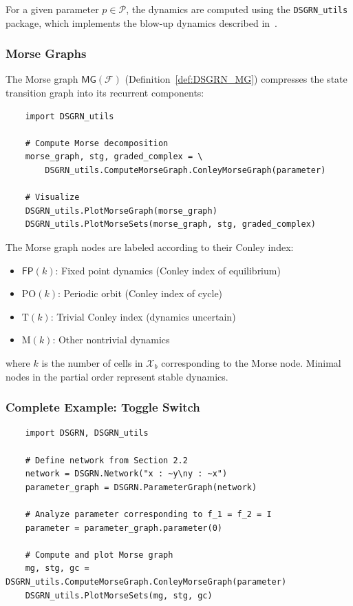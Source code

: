 \documentclass[12pt, notitlepage]{amsart}
\newcommand{\cF}{{\mathcal F}}
\newcommand{\cP}{{\mathcal P}}
\newcommand{\cX}{{\mathcal X}}
\theoremstyle{definition}
\newcommand{\MG}{\mathsf{MG}}
\newcommand{\FP}{\mathsf{FP}}
\begin{document}
    For a given parameter $p \in \cP$, the dynamics are computed using the \texttt{DSGRN\_utils} package, which implements the blow-up dynamics described in~\cite{rook_field:24}.

    \subsubsection{Morse Graphs}

    The Morse graph $\MG(\cF)$ (Definition~\ref{def:DSGRN_MG}) compresses the state transition graph into its recurrent components:

    \begin{lstlisting}
    import DSGRN_utils

    # Compute Morse decomposition
    morse_graph, stg, graded_complex = \
        DSGRN_utils.ComputeMorseGraph.ConleyMorseGraph(parameter)

    # Visualize
    DSGRN_utils.PlotMorseGraph(morse_graph)
    DSGRN_utils.PlotMorseSets(morse_graph, stg, graded_complex)
    \end{lstlisting}

    The Morse graph nodes are labeled according to their Conley index:
    \begin{itemize}
    \item $\FP(k)$: Fixed point dynamics (Conley index of equilibrium)
    \item $\text{PO}(k)$: Periodic orbit (Conley index of cycle)
    \item $\text{T}(k)$: Trivial Conley index (dynamics uncertain)
    \item $\text{M}(k)$: Other nontrivial dynamics
    \end{itemize}
    where $k$ is the number of cells in $\cX_b$ corresponding to the Morse node. Minimal nodes in the partial order represent stable dynamics.

    \subsubsection{Complete Example: Toggle Switch}

    \begin{lstlisting}
    import DSGRN, DSGRN_utils

    # Define network from Section 2.2
    network = DSGRN.Network("x : ~y\ny : ~x")
    parameter_graph = DSGRN.ParameterGraph(network)

    # Analyze parameter corresponding to f_1 = f_2 = I
    parameter = parameter_graph.parameter(0)

    # Compute and plot Morse graph
    mg, stg, gc = DSGRN_utils.ComputeMorseGraph.ConleyMorseGraph(parameter)
    DSGRN_utils.PlotMorseSets(mg, stg, gc)
    \end{lstlisting}
\end{document}
